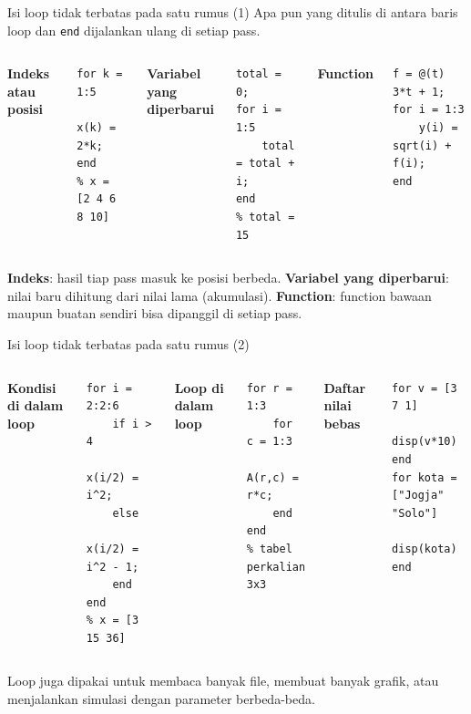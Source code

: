 \documentclass[aspectratio=169,11pt]{beamer}
\begin{document}
\begin{frame}[fragile]{Isi loop tidak terbatas pada satu rumus (1)}
\small Apa pun yang ditulis di antara baris loop dan \texttt{end} dijalankan
ulang di setiap pass.
\vspace{0.3em}
\begin{columns}[T]
\textbf{Indeks atau posisi}
\begin{lstlisting}[basicstyle=\ttfamily\scriptsize]
for k = 1:5
    x(k) = 2*k;
end
% x = [2 4 6 8 10]
\end{lstlisting}
\textbf{Variabel yang diperbarui}
\begin{lstlisting}[basicstyle=\ttfamily\scriptsize]
total = 0;
for i = 1:5
    total = total + i;
end
% total = 15
\end{lstlisting}
\textbf{Function}
\begin{lstlisting}[basicstyle=\ttfamily\scriptsize]
f = @(t) 3*t + 1;
for i = 1:3
    y(i) = sqrt(i) + f(i);
end
\end{lstlisting}
\end{columns}
\vspace{0.4em}
\footnotesize \textbf{Indeks}: hasil tiap pass masuk ke posisi berbeda.
\textbf{Variabel yang diperbarui}: nilai baru dihitung dari nilai lama
(akumulasi). \textbf{Function}: function bawaan maupun buatan sendiri bisa
dipanggil di setiap pass.
\end{frame}

\begin{frame}[fragile]{Isi loop tidak terbatas pada satu rumus (2)}
\begin{columns}[T]
\textbf{Kondisi di dalam loop}
\begin{lstlisting}[basicstyle=\ttfamily\footnotesize]
for i = 2:2:6
    if i > 4
        x(i/2) = i^2;
    else
        x(i/2) = i^2 - 1;
    end
end
% x = [3 15 36]
\end{lstlisting}
\textbf{Loop di dalam loop}
\begin{lstlisting}[basicstyle=\ttfamily\footnotesize]
for r = 1:3
    for c = 1:3
        A(r,c) = r*c;
    end
end
% tabel perkalian 3x3
\end{lstlisting}
\textbf{Daftar nilai bebas}
\begin{lstlisting}[basicstyle=\ttfamily\footnotesize]
for v = [3 7 1]
    disp(v*10)
end
for kota = ["Jogja" "Solo"]
    disp(kota)
end
\end{lstlisting}
\end{columns}
\vspace{0.4em}
\footnotesize Loop juga dipakai untuk membaca banyak file, membuat banyak
grafik, atau menjalankan simulasi dengan parameter berbeda-beda.
\end{frame}
\end{document}
